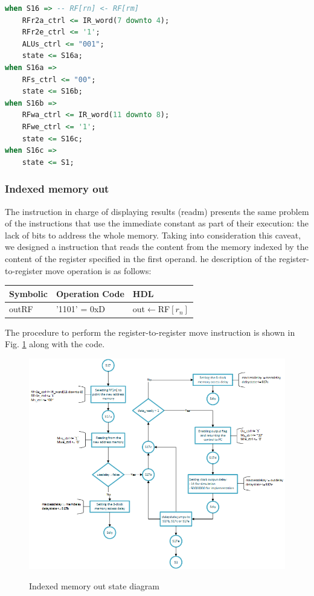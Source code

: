 \documentclass[]{article}
\begin{document}
\begin{lstlisting}[language=vhdl, caption={Register-to-register move state vhdl}, label={}]
when S16 =>	-- RF[rn] <- RF[rm] 							 
	RFr2a_ctrl <= IR_word(7 downto 4);
	RFr2e_ctrl <= '1';
	ALUs_ctrl <= "001";
	state <= S16a;
when S16a =>
	RFs_ctrl <= "00";				
	state <= S16b;
when S16b =>
	RFwa_ctrl <= IR_word(11 downto 8);
	RFwe_ctrl <= '1';			
	state <= S16c;
when S16c =>
	state <= S1;	
\end{lstlisting}

\subsubsection{Indexed memory out}

The instruction in charge of displaying results (readm) presents the same problem of the instructions that use the immediate constant as part of their execution: the lack of bits to address the whole memory. Taking into consideration this caveat, we designed a instruction that reads the content from the memory indexed by the content of the register specified in the first operand. he description of the register-to-register move operation is as follows:
\begin{table}[h]
	\centering
	{
		\begin{tabular}{|p{3cm}|p{3cm}|p{3cm}|}
			\hline
			\textbf{Symbolic} & \textbf{Operation Code} & \textbf{HDL}                   \\ \hline
			outRF              & '1101' = 0xD            & out$\leftarrow$RF$[r_n]$ \\ \hline
		\end{tabular}
	}
\end{table}

The procedure to perform the register-to-register move instruction is shown in Fig. \ref{fig:6} along with the code.

\begin{figure}[H]
	\caption{Indexed memory out state diagram}
	\centering
	\includegraphics[width=1\textwidth]{outRF}
	\label{fig:6}
\end{figure}
\end{document}
